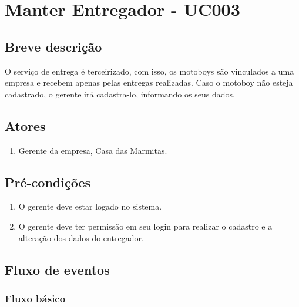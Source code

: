 \chapter{Manter Entregador - UC003} \label{uc003}

\section{Breve descrição}

O serviço de entrega é terceirizado, com isso, os motoboys são vinculados a uma empresa e recebem apenas pelas entregas realizadas. Caso o motoboy não esteja cadastrado, o gerente irá cadastra-lo, informando os seus dados.

\section{Atores}

\begin{enumerate}
	\item Gerente da empresa, Casa das Marmitas.
\end{enumerate}

\section{Pré-condições}

\begin{enumerate}
	\item O gerente deve estar logado no sistema.
	\item O gerente deve ter permissão em seu login para realizar o cadastro e a alteração dos dados do entregador.
\end{enumerate}

\section{Fluxo de eventos}

\subsection{Fluxo básico}

